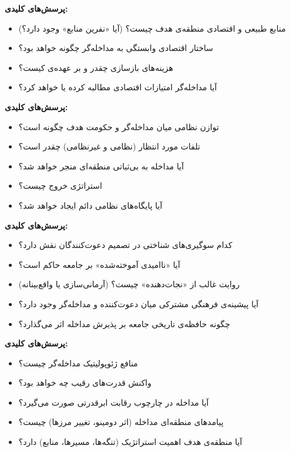 \begin{tcolorbox}[casebox, title={وجه ۳: تحلیل اقتصادی}]
\textbf{پرسش‌های کلیدی:}
\begin{itemize}[nosep, rightmargin=1em]
  \item منابع طبیعی و اقتصادی منطقه‌ی هدف چیست؟ (آیا «نفرین منابع» وجود دارد؟)
  \item ساختار اقتصادی وابستگی به مداخله‌گر چگونه خواهد بود؟
  \item هزینه‌های بازسازی چقدر و بر عهده‌ی کیست؟
  \item آیا مداخله‌گر امتیازات اقتصادی مطالبه کرده یا خواهد کرد؟
\end{itemize}
\end{tcolorbox}

\begin{tcolorbox}[casebox, title={وجه ۴: تحلیل نظامی-امنیتی}]
\textbf{پرسش‌های کلیدی:}
\begin{itemize}[nosep, rightmargin=1em]
  \item توازن نظامی میان مداخله‌گر و حکومت هدف چگونه است؟
  \item تلفات مورد انتظار (نظامی و غیرنظامی) چقدر است؟
  \item آیا مداخله به بی‌ثباتی منطقه‌ای منجر خواهد شد؟
  \item استراتژی خروج چیست؟
  \item آیا پایگاه‌های نظامی دائم ایجاد خواهد شد؟
\end{itemize}
\end{tcolorbox}

\begin{tcolorbox}[casebox, title={وجه ۵: تحلیل روان‌شناختی-فرهنگی}]
\textbf{پرسش‌های کلیدی:}
\begin{itemize}[nosep, rightmargin=1em]
  \item کدام سوگیری‌های شناختی در تصمیم دعوت‌کنندگان نقش دارد؟
  \item آیا «ناامیدی آموخته‌شده» بر جامعه حاکم است؟
  \item روایت غالب از «نجات‌دهنده» چیست؟ (آرمانی‌سازی یا واقع‌بینانه)
  \item آیا پیشینه‌ی فرهنگی مشترکی میان دعوت‌کننده و مداخله‌گر وجود دارد؟
  \item چگونه حافظه‌ی تاریخی جامعه بر پذیرش مداخله اثر می‌گذارد؟
\end{itemize}
\end{tcolorbox}

\begin{tcolorbox}[casebox, title={وجه ۶: تحلیل ژئوپولیتیک}]
\textbf{پرسش‌های کلیدی:}
\begin{itemize}[nosep, rightmargin=1em]
  \item منافع ژئوپولیتیک مداخله‌گر چیست؟
  \item واکنش قدرت‌های رقیب چه خواهد بود؟
  \item آیا مداخله در چارچوب رقابت ابرقدرتی صورت می‌گیرد؟
  \item پیامدهای منطقه‌ای مداخله (اثر دومینو، تغییر مرزها) چیست؟
  \item آیا منطقه‌ی هدف اهمیت استراتژیک (تنگه‌ها، مسیرها، منابع) دارد؟
\end{itemize}
\end{tcolorbox}

